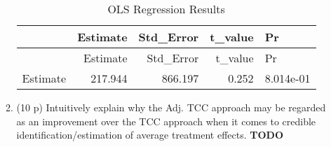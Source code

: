 \documentclass[
]{article}
\begin{document}
\begin{enumerate}
\begin{enumerate}
    \begin{longtable}[]{@{}lrrrl@{}}
    \caption{OLS Regression Results}\tabularnewline
    \toprule\noalign{}
    & Estimate & Std\_Error & t\_value & Pr \\
    \midrule\noalign{}
    \endfirsthead
    \toprule\noalign{}
    & Estimate & Std\_Error & t\_value & Pr \\
    \midrule\noalign{}
    \endhead
    \bottomrule\noalign{}
    \endlastfoot
    Estimate & 217.944 & 866.197 & 0.252 & 8.014e-01 \\
    \end{longtable}
  \item
    (10 p) Intuitively explain why the Adj. TCC approach may be regarded
    as an improvement over the TCC approach when it comes to credible
    identification/estimation of average treatment effects.
    \textbf{TODO}
  \end{enumerate}
\end{enumerate}

\pagebreak
\end{document}
